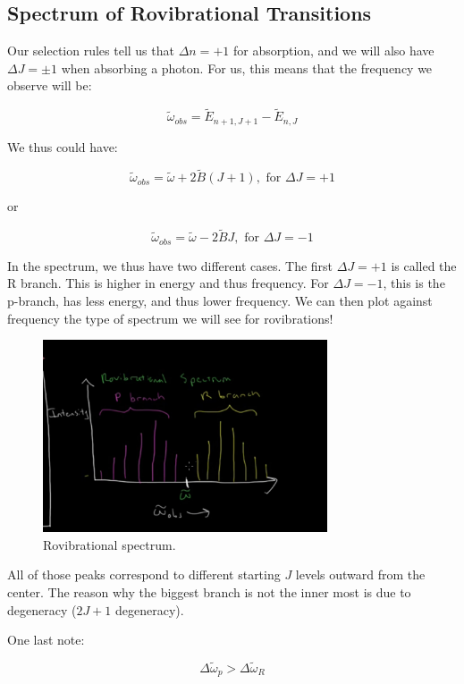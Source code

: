 \documentclass{article}
\newcommand{\be}{\begin{equation}}
\newcommand{\ee}{\end{equation}}
\begin{document}
\subsection{Spectrum of Rovibrational Transitions}

Our selection rules tell us that $\Delta n = +1$ for absorption, and we will also have $\Delta J = \pm 1$ when absorbing a photon. For us, this means that the frequency we observe will be:

\be
\tilde \omega_{obs} = \tilde E_{n+1, J+1} - \tilde E_{n, J}
\ee

We thus could have:

\be
\tilde \omega_{obs} = \tilde \omega + 2\tilde B \left(J+1\right), \text{ for } \Delta J = +1
\ee

or

\be
\tilde \omega_{obs} = \tilde \omega - 2\tilde B J, \text{ for } \Delta J = -1
\ee

In the spectrum, we thus have two different cases. The first $\Delta J = +1$ is called the R branch. This is higher in energy and thus frequency. For $\Delta J = -1$, this is the p-branch, has less energy, and thus lower frequency. We can then plot against frequency the type of spectrum we will see for rovibrations! 

 \begin{figure}
    \centering
    \includegraphics[width=0.75\textwidth]{figures/Screen Shot 2020-09-27 at 6.27.05 PM.png}
    \caption{Rovibrational spectrum.}
    \label{fig:rovospec}
\end{figure}

All of those peaks correspond to different starting $J$ levels outward from the center. The reason why the biggest branch is not the inner most is due to degeneracy ($2J+1$ degeneracy).

One last note:

\be
\Delta \tilde \omega_p > \Delta \tilde \omega_R
\ee
\end{document}
